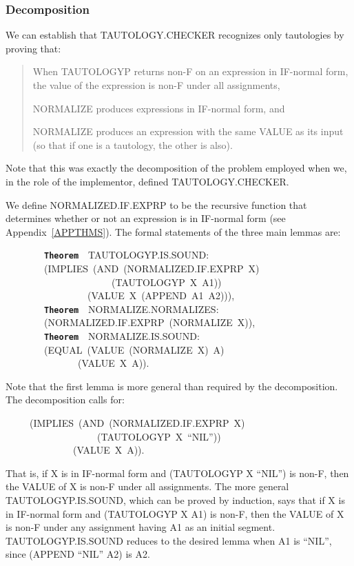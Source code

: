 \documentclass[11pt]{book}
\newenvironment{pubasis}{\begin{flushleft}\ttfamily\small}{\normalsize\rmfamily\end{flushleft}}
\newenvironment{pubcrown}{\begin{quote}}{\end{quote}}
\newcommand{\axiomordefinition}[1]{\vspace{6pt}\texttt{\textbf{#1}}}
\newcommand{\pubdefaulttextsize}{\large}
\begin{document}
\subsubsection{Decomposition}
\pubdefaulttextsize
We can establish that TAU\-TOL\-OGY.CHECK\-ER recognizes only tautologies by proving that:
\begin{pubcrown}
When TAUTOLOGYP returns non-F on an expression in
IF-normal form, the value of the expression is non-F under all assignments,

NORMALIZE produces expressions in IF-normal form, and

NORMALIZE produces an expression with the same VALUE
as its input (so that if one is a tautology, the other is also).
\end{pubcrown}

Note that this was exactly the decomposition of the problem employed
when we, in the role of the implementor, defined TAU\-TOL\-OGY.CHECK\-ER.

We define NOR\-MAL\-IZED.IF.EXPRP to be the recursive function that determines
whether or not an expression is in IF-normal form  (see Appendix~\ref{APPTHMS}).
The formal statements of the three main lemmas are:
\begin{pubasis}
~~~~~~~~\axiomordefinition{Theorem}~~TAU\-TOL\-OGYP.IS.SOUND:\\
~~~~~~~~(IMPLIES~(AND~(NOR\-MAL\-IZED.IF.EXPRP~X)\\
~~~~~~~~~~~~~~~~~~~~~~(TAUTOLOGYP~X~A1))\\
~~~~~~~~~~~~~~~~~(VALUE~X~(APPEND~A1~A2))),\\

~~~~~~~~\axiomordefinition{Theorem}~~NOR\-MAL\-IZE.NOR\-MAL\-IZES:\\
~~~~~~~~(NOR\-MAL\-IZED.IF.EXPRP~(NOR\-MAL\-IZE~X)),\\

~~~~~~~~\axiomordefinition{Theorem}~~NOR\-MAL\-IZE.IS.SOUND:\\
~~~~~~~~(EQUAL~(VALUE~(NORMALIZE~X)~A)\\
~~~~~~~~~~~~~~~(VALUE~X~A)).\\
\end{pubasis}
Note that the first lemma is more general than required by the decomposition.
The decomposition calls for:
\begin{pubasis}
~~~~~(IMPLIES~(AND~(NOR\-MAL\-IZED.IF.EXPRP~X)\\
~~~~~~~~~~~~~~~~~~~(TAUTOLOGYP~X~``NIL''))\\
~~~~~~~~~~~~~~(VALUE~X~A)).\\
\end{pubasis}
That is, if X is in IF-normal form and (TAUTOLOGYP X ``NIL'')
is non-F, then the VALUE of X is non-F under all assignments.
The more general
TAU\-TOL\-OGYP.IS.SOUND, which can be proved by induction,  says that if X is in IF-normal form and
(TAUTOLOGYP X A1) is non-F, then the VALUE of X is
non-F under any assignment having A1 as an initial segment.  TAU\-TOL\-OGYP.IS.SOUND
reduces to the desired lemma when A1 is ``NIL'', since (APPEND ``NIL'' A2) is A2.
\end{document}
